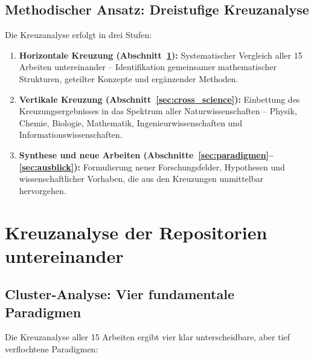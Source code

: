 ﻿\documentclass[a4paper,12pt]{scrreprt}
\theoremstyle{definition}
\begin{document}
\subsection{Methodischer Ansatz: Dreistufige Kreuzanalyse}

Die Kreuzanalyse erfolgt in drei Stufen:

\begin{enumerate}
  \item \textbf{Horizontale Kreuzung (Abschnitt~\ref{sec:cross_repos}):}
    Systematischer Vergleich aller 15 Arbeiten untereinander -- Identifikation
    gemeinsamer mathematischer Strukturen, geteilter Konzepte und ergänzender Methoden.

  \item \textbf{Vertikale Kreuzung (Abschnitt~\ref{sec:cross_science}):}
    Einbettung des Kreuzungsergebnisses in das Spektrum aller Naturwissenschaften
    -- Physik, Chemie, Biologie, Mathematik, Ingenieurwissenschaften und
    Informationswissenschaften.

  \item \textbf{Synthese und neue Arbeiten (Abschnitte~\ref{sec:paradigmen}--\ref{sec:ausblick}):}
    Formulierung neuer Forschungsfelder, Hypothesen und wissenschaftlicher Vorhaben,
    die aus den Kreuzungen unmittelbar hervorgehen.
\end{enumerate}

\section{Kreuzanalyse der Repositorien untereinander}
\label{sec:cross_repos}

\subsection{Cluster-Analyse: Vier fundamentale Paradigmen}
\label{ssec:cluster}

Die Kreuzanalyse aller 15 Arbeiten ergibt vier klar unterscheidbare, aber
tief verflochtene Paradigmen:
\end{document}
